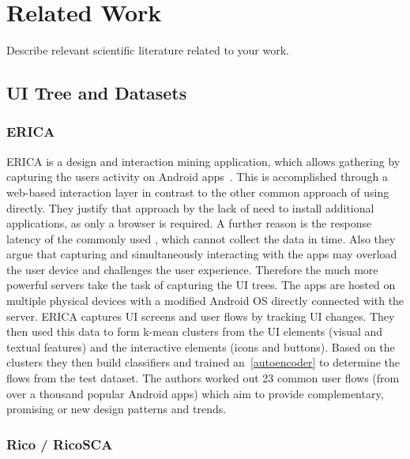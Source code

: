 \chapter{Related Work}

Describe relevant scientific literature related to your work.

\section{UI Tree and Datasets}

\subsection{ERICA}

ERICA is a design and interaction mining application, which allows gathering  by capturing the users activity on Android apps~\cite{deka2016erica}.
This is accomplished through a web-based interaction layer in contrast to the other common approach of using  directly.
They justify that approach by the lack of need to install additional applications, as only a browser is required.
A further reason is the response latency of the commonly used , which cannot collect the data in time.
Also they argue that capturing and simultaneously interacting with the apps may overload the user device and challenges the user experience.
Therefore the much more powerful servers take the task of capturing the UI trees.
The apps are hosted on multiple physical devices with a modified Android OS directly connected with the server.
ERICA captures UI screens and user flows by tracking UI changes.
They then used this data to form k-mean clusters from the UI elements (visual and textual features) and the interactive elements (icons and buttons).
Based on the clusters they then build classifiers and trained an~\ref{autoencoder} to determine the flows from the test dataset.
The authors worked out 23 common user flows (from over a thousand popular Android apps) which aim to provide complementary, promising or new design patterns and trends.



\subsection{Rico / RicoSCA}

